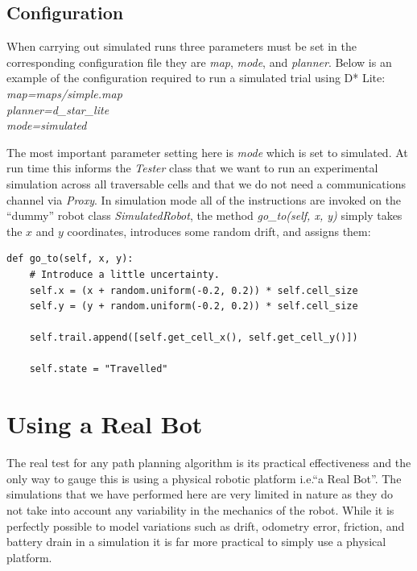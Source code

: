 \subsection{Configuration}
\noindent 
When carrying out simulated runs three parameters must be set in the corresponding configuration file they are \textit{map}, \textit{mode}, and \textit{planner}. Below is an example of the configuration required to run a simulated trial using D* Lite: \\

	\indent \textit{map=maps/simple.map \\}
	\indent \textit{planner=d\_star\_lite \\}
	\indent \textit{mode=simulated \\}

\noindent
The most important parameter setting here is \textit{mode} which is set to simulated. At run time this informs the \textit{Tester} class that we want to run an experimental simulation across all traversable cells and that we do not need a communications channel via \textit{Proxy}. In simulation mode all of the instructions are invoked on the ``dummy'' robot class \textit{SimulatedRobot}, the method \textit{go\_to(self, x, y)} simply takes the $x$ and $y$ coordinates, introduces some random drift, and assigns them: \\

\begin{lstlisting}
def go_to(self, x, y):
	# Introduce a little uncertainty.
    self.x = (x + random.uniform(-0.2, 0.2)) * self.cell_size  
    self.y = (y + random.uniform(-0.2, 0.2)) * self.cell_size
    
    self.trail.append([self.get_cell_x(), self.get_cell_y()])
    
    self.state = "Travelled"
\end{lstlisting}


\section{Using a Real Bot}
\noindent
The real test for any path planning algorithm is its practical effectiveness \cite{FIELD} and the only way to gauge this is using a physical robotic platform i.e.``a Real Bot''. The simulations that we have performed here are very limited in nature as they do not take into account any variability in the mechanics of the robot. While it is perfectly possible to model variations such as drift, odometry error, friction, and battery drain in a simulation it is far more practical to simply use a physical platform.  \\
  
